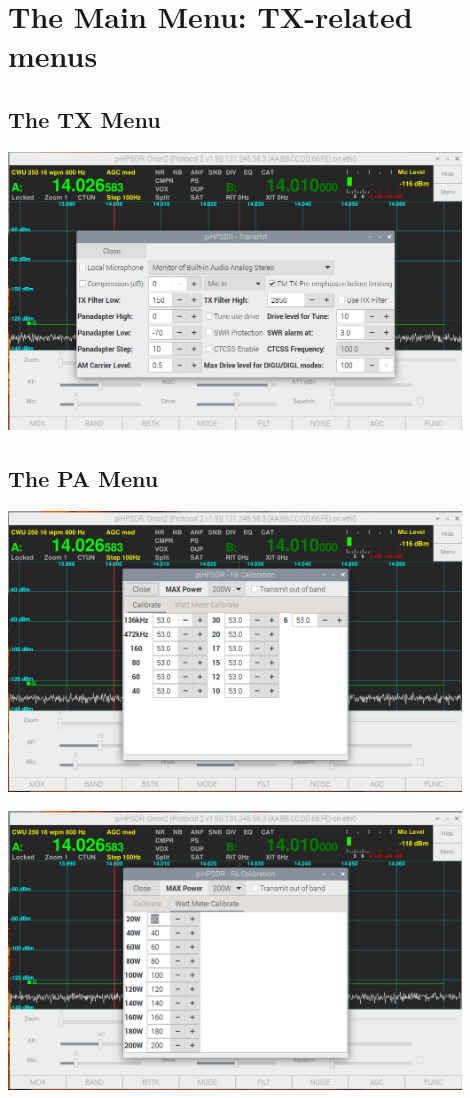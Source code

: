 \documentclass[12pt]{book}
\begin{document}
\chapter{The Main Menu: TX-related menus}

\section{The TX Menu}
\begin{center}
\includegraphics[width=12cm]{TXMenu.png}
\end{center}

\section{The PA Menu}
\begin{center}
\includegraphics[width=12cm]{PAMenuCalibrate.png}
\end{center}

\begin{center}
\includegraphics[width=12cm]{PAMenuWatt.png}
\end{center}
\end{document}
